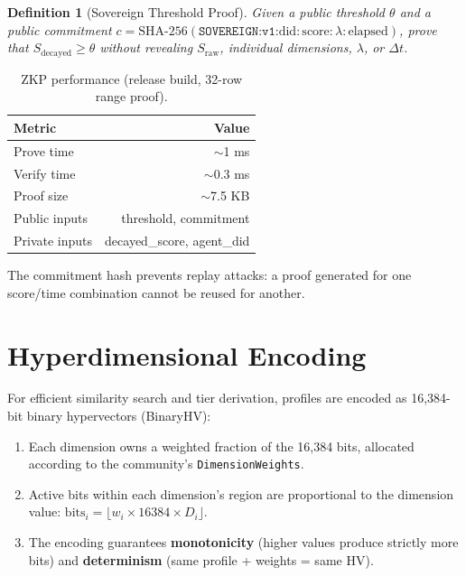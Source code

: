 \documentclass[11pt,twocolumn]{article}
\newtheorem{definition}{Definition}
\begin{document}
\begin{definition}[Sovereign Threshold Proof]
Given a public threshold $\theta$ and a public commitment $c = \text{SHA-256}(\texttt{SOVEREIGN:v1:}\text{did}:\text{score}:\lambda:\text{elapsed})$, prove that $S_{\text{decayed}} \geq \theta$ without revealing $S_{\text{raw}}$, individual dimensions, $\lambda$, or $\Delta t$.
\end{definition}

\begin{table}[H]
\centering
\caption{ZKP performance (release build, 32-row range proof).}
\label{tab:zkp}
\begin{tabular}{lr}
\toprule
\textbf{Metric} & \textbf{Value} \\
\midrule
Prove time & $\sim$1 ms \\
Verify time & $\sim$0.3 ms \\
Proof size & $\sim$7.5 KB \\
Public inputs & threshold, commitment \\
Private inputs & decayed\_score, agent\_did \\
\bottomrule
\end{tabular}
\end{table}

The commitment hash prevents replay attacks: a proof generated for one score/time combination cannot be reused for another.

\section{Hyperdimensional Encoding}
\label{sec:hdc}

For efficient similarity search and tier derivation, profiles are encoded as 16,384-bit binary hypervectors (BinaryHV):

\begin{enumerate}[nosep]
  \item Each dimension owns a weighted fraction of the 16,384 bits, allocated according to the community's \texttt{DimensionWeights}.
  \item Active bits within each dimension's region are proportional to the dimension value: $\text{bits}_i = \lfloor w_i \times 16384 \times D_i \rfloor$.
  \item The encoding guarantees \textbf{monotonicity} (higher values produce strictly more bits) and \textbf{determinism} (same profile + weights = same HV).
\end{enumerate}
\end{document}
